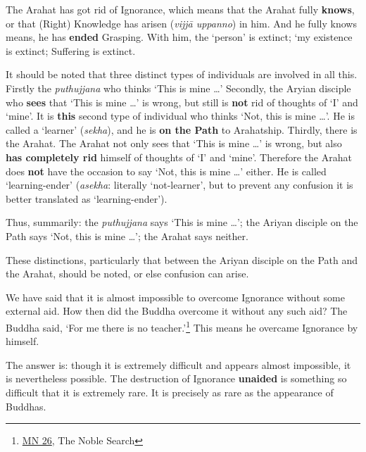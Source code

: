 The Arahat has got rid of Ignorance, which means that the Arahat fully \textbf{knows}, or that (Right) Knowledge has arisen (\emph{vijjā uppanno}) in him. And he fully knows means, he has \textbf{ended} Grasping. With him, the `person' is extinct; `my existence is extinct; Suffering is extinct.

It should be noted that three distinct types of individuals are involved in all this. Firstly the \emph{puthujjana} who thinks `This is mine \ldots\hspace{0pt}' Secondly, the Aryian disciple who \textbf{sees} that `This is mine \ldots\hspace{0pt}' is wrong, but still is \textbf{not} rid of thoughts of `I' and `mine'. It is \textbf{this} second type of individual who thinks `Not, this is mine \ldots\hspace{0pt}'. He is called a `learner' (\emph{sekha}), and he is \textbf{on the Path} to Arahatship. Thirdly, there is the Arahat. The Arahat not only sees that `This is mine \ldots\hspace{0pt}' is wrong, but also \textbf{has completely rid} himself of thoughts of `I' and `mine'. Therefore the Arahat does \textbf{not} have the occasion to say `Not, this is mine \ldots\hspace{0pt}' either. He is called `learning-ender' (\emph{asekha}: literally `not-learner', but to prevent any confusion it is better translated as `learning-ender').

Thus, summarily: the \emph{puthujjana} says `This is mine \ldots\hspace{0pt}'; the Ariyan disciple on the Path says `Not, this is mine \ldots\hspace{0pt}'; the Arahat says neither.

These distinctions, particularly that between the Ariyan disciple on the Path and the Arahat, should be noted, or else confusion can arise.

We have said that it is almost impossible to overcome Ignorance without some external aid. How then did the Buddha overcome it without any such aid? The Buddha said, `For me there is no teacher.'\footnote{\href{https://suttacentral.net/mn26/en/bodhi}{MN 26}, The Noble Search} This means he overcame Ignorance by himself.

The answer is: though it is extremely difficult and appears almost impossible, it is nevertheless possible. The destruction of Ignorance \textbf{unaided} is something so difficult that it is extremely rare. It is precisely as rare as the appearance of Buddhas.
